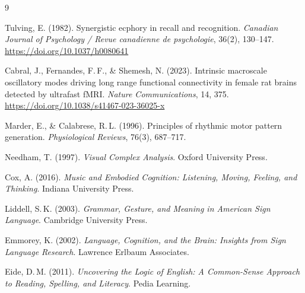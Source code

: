 \documentclass[12pt, a4paper]{article}
\begin{document}
\begin{thebibliography}{9}

Tulving, E. (1982).
Synergistic ecphory in recall and recognition.
\textit{Canadian Journal of Psychology / Revue canadienne de psychologie}, 36(2), 130--147.
\url{https://doi.org/10.1037/h0080641}

Cabral, J., Fernandes, F.\,F., \& Shemesh, N. (2023).
Intrinsic macroscale oscillatory modes driving long range functional connectivity in female rat brains detected by ultrafast fMRI.
\textit{Nature Communications}, 14, 375.
\url{https://doi.org/10.1038/s41467-023-36025-x}

Marder, E., \& Calabrese, R.\,L. (1996).
Principles of rhythmic motor pattern generation.
\textit{Physiological Reviews}, 76(3), 687--717.

Needham, T. (1997).
\textit{Visual Complex Analysis}.
Oxford University Press.

Cox, A. (2016).
\textit{Music and Embodied Cognition: Listening, Moving, Feeling, and Thinking}.
Indiana University Press.

Liddell, S.\,K. (2003).
\textit{Grammar, Gesture, and Meaning in American Sign Language}.
Cambridge University Press.

Emmorey, K. (2002).
\textit{Language, Cognition, and the Brain: Insights from Sign Language Research}.
Lawrence Erlbaum Associates.

Eide, D.\,M. (2011).
\textit{Uncovering the Logic of English: A Common-Sense Approach to Reading, Spelling, and Literacy}.
Pedia Learning.

\end{thebibliography}
\end{document}
